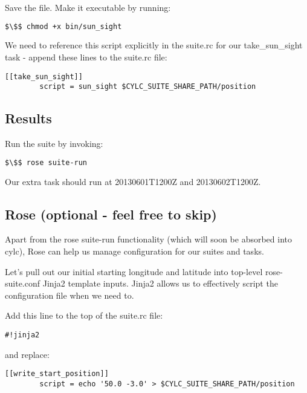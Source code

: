 Save the file. Make it executable by running:

\begin{lstlisting}[mathescape, language=bash]
$\$$ chmod +x bin/sun_sight
\end{lstlisting}

We need to reference this script explicitly in the suite.rc for our take\_sun\_sight task - append these lines to the suite.rc file:

\lstset{language=suiterc}
\begin{lstlisting}[columns=fullflexible]
    [[take_sun_sight]]
        script = sun_sight $CYLC_SUITE_SHARE_PATH/position
\end{lstlisting}

\subsection{Results}

Run the suite by invoking:
\begin{lstlisting}[mathescape, language=bash]
$\$$ rose suite-run
\end{lstlisting}

Our extra task should run at 20130601T1200Z and 20130602T1200Z.

\subsection{Rose (optional - feel free to skip)}
\label{Rose}

Apart from the rose suite-run functionality (which will soon be absorbed into cylc), Rose can help us manage configuration for our suites and tasks.

Let's pull out our initial starting longitude and latitude into top-level rose-suite.conf Jinja2 template inputs. Jinja2 allows us to effectively script the configuration file when we need to.

Add this line to the top of the suite.rc file:

\lstset{language=suiterc}
\begin{lstlisting}[columns=fullflexible]
#!jinja2
\end{lstlisting}

and replace:

\lstset{language=suiterc}
\begin{lstlisting}[columns=fullflexible]
    [[write_start_position]]
        script = echo '50.0 -3.0' > $CYLC_SUITE_SHARE_PATH/position
\end{lstlisting}

